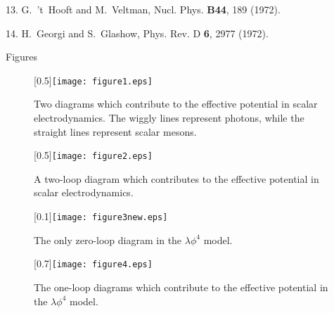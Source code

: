 \documentclass[12pt,epsf]{report}
\begin{document}
13. G.~'t~Hooft and M.~Veltman, Nucl. Phys. {\bf B44}, 189 (1972).

\smallskip
\smallskip

14.  H.~Georgi and S.~Glashow, Phys. Rev. D {\bf 6}, 2977 (1972).

\vfill\eject

\centerline{Figures}

\begin{figure}[h]
\begin{center}
\scalebox{0.5}[0.5]{\texttt{[image: figure1.eps]}}
\par
\vskip-2.0cm{}
\end{center}
\begin{quote}
\caption{\small Two diagrams which contribute to the effective
potential in scalar electrodynamics.  The wiggly lines represent
photons, while the straight lines represent scalar mesons. }
\end{quote}
\end{figure}

\begin{figure}[h]
\begin{center}
\scalebox{0.5}[0.5]{\texttt{[image: figure2.eps]}}
\par
\vskip-2.0cm{}
\end{center}
\begin{quote}
\caption{\small  A two-loop diagram which contributes to the 
effective potential in scalar electrodynamics.}
\end{quote}
\end{figure}

\clearpage
\phantom{here}

\begin{figure}[t]
\begin{center}
\scalebox{0.1}[0.1]{\texttt{[image: figure3new.eps]}}
\par
\vskip-2.0cm{}
\end{center}
\begin{quote}
\caption{\small The only zero-loop diagram in the $\lambda\phi^4$ model.}
\end{quote}
\end{figure}


\begin{figure}[ht]
\begin{center}
\scalebox{0.7}[0.7]{\texttt{[image: figure4.eps]}}
\par
\vskip-12.0cm{}
\end{center}
\begin{quote}
\caption{\small The one-loop diagrams which contribute to the
effective potential in the $\lambda \phi^4$ model.}
\end{quote}
\end{figure}
\end{document}
